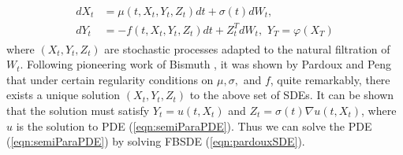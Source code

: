 \begin{align}\label{eqn:pardouxSDE}
\begin{split}
    dX_t &= \mu (t,X_t,Y_t,Z_t)dt + \sigma (t)dW_t,\\
    dY_t &= -f(t,X_t,Y_t,Z_t)dt + Z_t^TdW_t, \,\, Y_T = \varphi(X_T)
\end{split}
\end{align}
where $(X_t,Y_t,Z_t)$ are stochastic processes adapted to the natural filtration of $W_t$. Following pioneering work of Bismuth \cite{bismut_conjugate_1973}, it was shown by Pardoux and Peng \cite{pardoux_adapted_1990,pardoux_backward_1998,pardoux_forward-backward_1999} that under certain regularity conditions on $\mu,\sigma,$ and $f$, quite remarkably, there exists a unique solution $(X_t,Y_t,Z_t)$ to the above set of SDEs. It can be shown that the solution must satisfy $Y_t = u(t,X_t)$ and $Z_t = \sigma(t)\nabla u(t,X_t)$, where $u$ is the solution to PDE (\ref{eqn:semiParaPDE}). Thus we can solve the PDE (\ref{eqn:semiParaPDE}) by solving FBSDE (\ref{eqn:pardouxSDE}).

